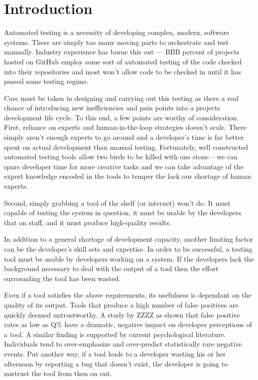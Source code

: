 \section{Introduction}
\label{SEC:introduction}

Automated testing is a necessity of developing complex, modern, software
systems.  There are simply too many moving parts to orchestrate and test
manually.  Industry experience has borne this out --- BBB percent of
projects hosted on GitHub employ some sort of automated testing of the code
checked into their repositories and most won't allow code to be checked in
until it has passed some testing regime.

Care must be taken in designing and carrying out this testing as there a
real chance of introducing new inefficiencies and pain points into a
projects development life cycle.  To this end, a few points are worthy of
consideration. First, reliance on experts and human-in-the-loop strategies
doesn't scale.  There simply aren't enough experts to
go around and a developer's time is far better spent on actual development
than manual testing.  Fortunately, well
constructed automated testing tools allow two birds to be killed with one
stone -- we can spare developer time for more creative tasks and we can
take advantage of the expert knowledge encoded in the tools to temper the
lack our shortage of human experts.


Second, simply grabbing a tool of the shelf (or internet) won't do.  It
must capable of testing the system in question, it must be usable by the
developers that on staff, and it must produce high-quality results.

In addition to a general shortage of development capacity, another limiting
factor can be the developer's skill sets and expertise.  In order to be
successful, a testing tool must be usable by developers working on a
system.  If the developers lack the background necessary to deal with the
output of a tool then the effort surrounding the tool has been wasted.

Even if a tool satisfies the above requirements, its usefulness is
dependant on the quality of its output.  Tools that produce a high number
of false positives are quickly deemed untrustworthy.  A study by ZZZZ as
shown that false positive rates as low as Q\% have a dramatic, negative
impact on developer perceptions of a tool.    A similar
finding is supported by current psychological literature.  Individuals tend
to over-emphasize and over-predict statistically rare negative
events.  Put another way, if a tool leads to a developer
wasting his or her afternoon by reporting a bug that doesn't exist, the
developer is going to mistrust the tool from then on out.

